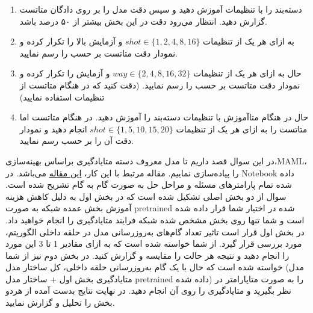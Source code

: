 \documentclass{article}
\begin{document}
\begin{enumerate}


\item
دسته‌بند را با تنظیمات
آموزش دهید و سپس دقت مدل را بر روی دادگان متاتست گزارش دهید.
انتظار می‌رود دقت در این بخش بیشتر از ۵۰ درصد باشد.

\item
به ازای هر یک از تنظیمات
$shot \in \{1, 2, 4, 8, 16\}$
و
آزمایش بالا را تکرار کرده و نمودار دقت متاتست بر حسب
را رسم نمایید.

\item
حال به ازای هر یک از تنظیمات
$way \in \{2, 4, 8, 16, 32\}$
و
آزمایش را تکرار کرده و نمودار دقت متاتست بر حسب
را رسم نمایید.
(دقت کنید که در هنگام متاتست از تنظیمات
استفاده نمایید)


\item
حال در هنگام متاآموزش با تنظیمات
دسته‌بند را آموزش دهید.
در هنگام متاتست اما متاتست را به ازای هر یک از تنظیمات
$shot \in \{1, 5,10, 15, 20\} $
انجام دهید و نمودار دقت آن را بر حسب 
رسم نمایید.

\end{enumerate}




در این سوال قصد داریم تا مدل معروف دسته متایادگیری براساس بهینه‌سازی،‌MAML،‌ را پیاده‌سازی نماییم. مقاله مرتبط با این کار،
\href{https://arxiv.org/pdf/1703.03400}{این مقاله}
می‌باشد. در Notebook داده شده تمام پارامترهای مسئله و مراحل حل به صورت گام به گام تشریح شده است.
سوال از دو بخش اصلی تشکیل شده است که در بخش اول به دلیل کاهش هزینه آموزش بخش عمده شبکه به صورت pretrained شده در اختیار شما قرار داده شده است و شما تنها روی بخش مشخص شده شبکه فرایند متایادگیری را انجام خواهید داد. در بخش اول قرار است تاثیر تعداد گام‌های به‌روزرسانی مدل در حلقه داخلی الگوریتم، مورد بررسی قرار گیرد. از شما خواسته شده است که به ازای مقادیر 1 تا 3 این مورد را انجام دهید و نتیجه هر حالت را مقایسه و گزارش کنید. در بخش دوم نیز از شما خواسته شده است که حال با یک گام به‌روزرسانی حلقه داخلی‌، کل ساختار مدل (مدل متایادگیری بخش اول + ساختار مدل pretrained داده شده) را به صورت متاپارامتر در نظر بگیرید و متایادگیری را روی آن انجام دهید. در نهایت نتایج بدست آمده از هردو بخش را تحلیل و گزارش نمایید.
\end{document}

